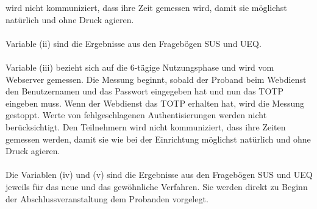 wird nicht kommuniziert, dass ihre Zeit gemessen wird, damit sie möglichst 
natürlich und ohne Druck agieren.
\\\\
Variable (ii) sind die Ergebnisse aus den Fragebögen SUS und UEQ. 
\\\\
Variable (iii) bezieht sich auf die 6-tägige Nutzungsphase und wird vom 
Webserver gemessen. Die Messung beginnt, sobald der Proband beim Webdienst den 
Benutzernamen und das Passwort eingegeben hat und nun das TOTP eingeben muss. 
Wenn der Webdienst das TOTP erhalten hat, wird die Messung gestoppt. Werte von 
fehlgeschlagenen Authentisierungen werden nicht berücksichtigt. Den Teilnehmern 
wird nicht kommuniziert, dass ihre Zeiten gemessen werden, damit sie wie bei der 
Einrichtung möglichst natürlich und ohne Druck agieren.
\\\\
Die Variablen (iv) und (v) sind die Ergebnisse aus den Fragebögen SUS und UEQ 
jeweils für das neue und das gewöhnliche Verfahren. Sie werden direkt zu Beginn 
der Abschlussveranstaltung dem Probanden vorgelegt.